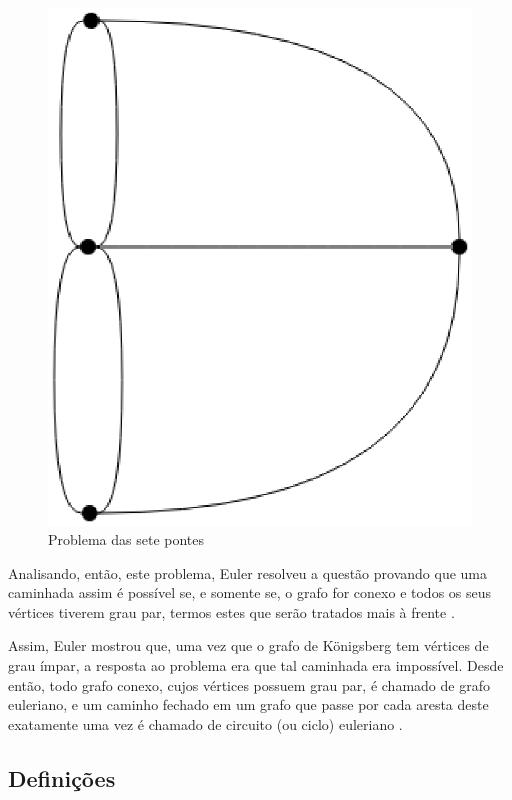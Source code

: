 \begin{figure}[!h]
	\centering
	\includegraphics[scale=0.25]{figuras/capitulo2/sete_pontes.eps}
	\caption[Problema das sete pontes]{Problema das sete pontes \cite{Ore:1963}}
	\label{sete_pontes}
\end{figure}

Analisando, então, este problema, Euler resolveu a questão provando que uma caminhada assim é possível se, e somente se, o grafo for conexo e todos os seus vértices tiverem grau par, termos estes que serão tratados mais à frente \cite{Malta:2008}.

Assim, Euler mostrou que, uma vez que o grafo de Königsberg tem vértices de grau ímpar, a resposta ao problema era que tal caminhada era impossível. Desde então, todo grafo conexo, cujos vértices possuem grau par, é chamado de grafo euleriano, e um caminho fechado em um grafo que passe por cada aresta deste exatamente uma vez é chamado de circuito (ou ciclo) euleriano \cite{Malta:2008}.

\subsection{Definições}

